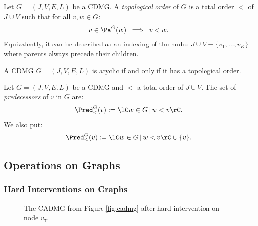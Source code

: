 \begin{Def}
    Let $G=(J,V,E,L)$ be a CDMG.
    A \emph{topological order} of $G$ is a total order $<$ of $J \cup V$ such that for all $v,w \in G$:
    \[ v \in \Pa^G(w) \; \implies \; v < w.\]
    Equivalently, it can be described as an indexing of the nodes $J \cup V = \{v_1,\dots,v_K\}$ where parents always precede their children.
\end{Def}

\begin{Lem}
        A CDMG  $G=(J,V,E,L)$ is acyclic if and only if it has a topological order.
\end{Lem}

\begin{Def}[Predecessors]
   Let $G=(J,V,E,L)$ be a CDMG and $<$ a total order of $J \cup V$.
   The set of \emph{predecessors} of $v$ in $G$ are:
   \[\Pred^G_<(v) : = \lC w\in G\,|\, w < v \rC.\]
   We also put:
   \[\Pred^G_\le(v) : = \lC w\in G\,|\, w < v \rC \cup \{v\}.\]
\end{Def}


\subsection{Operations on Graphs}

\subsubsection{Hard Interventions on Graphs}


\begin{figure}[ht]
\centering
{}
\caption{The CADMG from Figure \ref{fig:cadmg} after hard intervention on node $v_7$.}
\end{figure}

